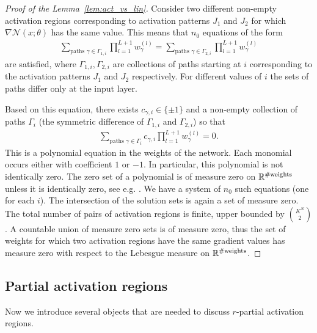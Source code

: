 \documentclass{article}
\theoremstyle{definition}
\newcommand{\net}{\mathcal{N}}
\newcommand{\nin}{n_0}
\begin{document}
\actvslinlemma*
\begin{proof}[Proof of the Lemma~\ref{lem:act_vs_lin}]
    Consider two different non-empty activation regions corresponding to activation patterns $J_1$ and $J_2$ for which $\nabla \net (x; \theta)$ has the same value. 
    This means that $\nin$ equations of the form
    \begin{align*}
         \sum_{\text{paths }\gamma \in \Gamma_{1, i}} \prod_{l=1}^{L+1} w_{\gamma}^{(l)} = \sum_{\text{paths }\gamma \in \Gamma_{2, i}} \prod_{l=1}^{L+1} w_{\gamma}^{(l)}
    \end{align*}
    are satisfied, where $\Gamma_{1, i}, \Gamma_{2, i}$ are collections of paths starting at $i$ corresponding to the activation patterns $J_1$ and $J_2$ respectively.
    For different values of $i$ the sets of paths differ only at the input layer. 
    
    Based on this equation, there exists $c_{\gamma, i} \in \{\pm 1\}$ and a non-empty collection of paths $\Gamma_i$  (the symmetric difference of $\Gamma_{1,i}$ and $\Gamma_{2,i}$) so that 
    \begin{align*}
        \sum_{\text{paths }\gamma \in \Gamma_i} c_{\gamma, i} \prod_{l=1}^{L+1} w_{\gamma}^{(l)} = 0.
    \end{align*}
    This is a polynomial equation in the weights of the network. 
    Each monomial occurs either with coefficient $1$ or $-1$. In particular, this polynomial is not identically zero. 
    The zero set of a polynomial is of measure zero on $\mathbb{R}^{\# \text{\normalfont weights}}$ unless it is identically zero, see e.g. \citet{caron2005zero}.
    We have a system of $\nin$ such equations (one for each $i$). 
    The intersection of the solution sets is again a set of measure zero.
    The total number of pairs of activation regions is finite, upper bounded by $\binom{K^N}{2}$. 
    A countable union of measure zero sets is of measure zero, thus the set of weights for which two activation regions have the same gradient values has measure zero with respect to the Lebesgue measure on $\mathbb{R}^{\# \text{\normalfont weights}}$.
\end{proof}

\subsection{Partial activation regions} 

Now we introduce several objects that are needed to discuss $r$-partial activation regions. 
\end{document}
